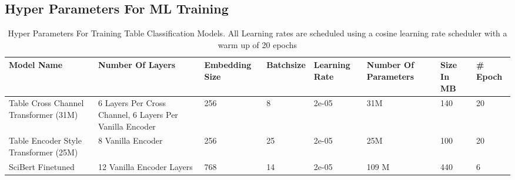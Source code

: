 \subsection{Hyper Parameters For ML Training}
\begin{table}[h]
  \label{table\arabic{tablecounter}}
  \centering
  \begin{tabular}{|p{1.25cm}|p{1.25cm}|p{1.75cm}|p{1.5cm}|p{1.5cm}|p{1.5cm}|p{1cm}|p{1cm}|}
  \hline
      Model Name & Number Of Layers &  Embedding Size & Batchsize & Learning Rate & Number Of Parameters & Size In MB & \# Epoch\\ \hline
      Table Cross Channel Transformer (31M) & 6 Layers Per Cross Channel, 6 Layers Per Vanilla Encoder & 256 & 8 & 2e-05 & 31M & 140 & 20\\ \hline
      Table Encoder Style Transformer (25M) & 8 Vanilla Encoder & 256 & 25 & 2e-05 & 25M & 100 & 20\\ \hline
      SciBert Finetuned & 12 Vanilla Encoder Layers & 768 & 14 & 2e-05 & 109 M & 440 & 6 \\ \hline
  \end{tabular}
  \caption{\label{tablecounter} Hyper Parameters For Training Table Classification Models. All Learning rates are scheduled using a cosine learning rate scheduler with a warm up of 20 epochs }
\end{table}
